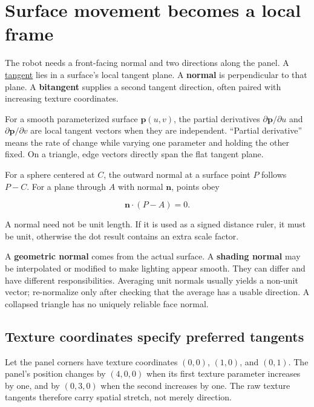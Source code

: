 \section{Surface movement becomes a local frame}\label{01-foundations-i-ch017-surface-movement-becomes-a-local-frame}

The robot needs a front-facing normal and two directions along the panel. A \hyperref[01-foundations-i-ch017-surface-movement-becomes-a-local-frame]{tangent} lies in a surface's local tangent plane. A \textbf{normal} is perpendicular to that plane. A \textbf{bitangent} supplies a second tangent direction, often paired with increasing texture coordinates.

For a smooth parameterized surface \(\mathbf p(u,v)\), the partial derivatives \(\partial\mathbf p/\partial u\) and \(\partial\mathbf p/\partial v\) are local tangent vectors when they are independent. ``Partial derivative'' means the rate of change while varying one parameter and holding the other fixed. On a triangle, edge vectors directly span the flat tangent plane.

For a sphere centered at \(C\), the outward normal at a surface point \(P\) follows \(P-C\). For a plane through \(A\) with normal \(\mathbf n\), points obey

\[
\mathbf n\cdot(P-A)=0.
\]

A normal need not be unit length. If it is used as a signed distance ruler, it must be unit, otherwise the dot result contains an extra scale factor.

A \textbf{geometric normal} comes from the actual surface. A \textbf{shading normal} may be interpolated or modified to make lighting appear smooth. They can differ and have different responsibilities. Averaging unit normals usually yields a non-unit vector; re-normalize only after checking that the average has a usable direction. A collapsed triangle has no uniquely reliable face normal.

\subsection{Texture coordinates specify preferred tangents}\label{01-foundations-i-ch017-texture-coordinates-specify-preferred-tangents}

Let the panel corners have texture coordinates \((0,0)\), \((1,0)\), and \((0,1)\). The panel's position changes by \((4,0,0)\) when its first texture parameter increases by one, and by \((0,3,0)\) when the second increases by one. The raw texture tangents therefore carry spatial stretch, not merely direction.

